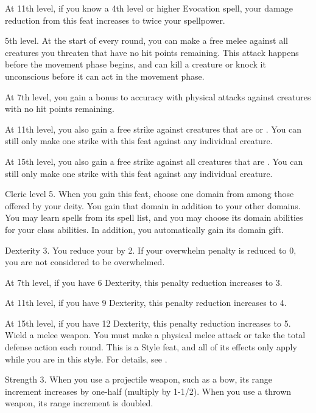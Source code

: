     At 11th level, if you know a 4th level or higher Evocation spell, your damage reduction from this feat increases to twice your spellpower.

    \featpres 5th level.
    \featben At the start of every round, you can make a free melee  against all creatures you threaten that have no hit points remaining.
    This attack happens before the movement phase begins, and can kill a creature or knock it unconscious before it can act in the movement phase.

    At 7th level, you gain a  bonus to accuracy with physical attacks against creatures with no hit points remaining.

    At 11th level, you also gain a free strike against creatures that are \helpless or \unaware.
    You can still only make one strike with this feat against any individual creature.

    At 15th level, you also gain a free strike against all creatures that are \bloodied.
    You can still only make one strike with this feat against any individual creature.

    \featpre Cleric level 5.
    \featben When you gain this feat, choose one domain from among those offered by your deity.
    You gain that domain in addition to your other domains.
    You may learn spells from its spell list, and you may choose its domain abilities for your class abilities.
    In addition, you automatically gain its domain gift.

    \featpres Dexterity 3.
    \featben You reduce your  by 2.
    If your overwhelm penalty is reduced to 0, you are not considered to be overwhelmed.

    At 7th level, if you have 6 Dexterity, this penalty reduction increases to 3.

    At 11th level, if you have 9 Dexterity, this penalty reduction increases to 4.

    At 15th level, if you have 12 Dexterity, this penalty reduction increases to 5.
    \stylereq Wield a melee weapon. You must make a physical melee attack or take the total defense action each round.
     This is a Style feat, and all of its effects only apply while you are in this style.
    For details, see .

    \featpre Strength 3.
    \featben When you use a projectile weapon, such as a bow, its range increment increases by one-half (multiply by 1-1/2).
    When you use a thrown weapon, its range increment is doubled.

